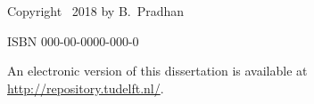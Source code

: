 \begin{titlepage}
\vspace{4\bigskipamount}

\noindent Copyright \textcopyright\ 2018 by B.~Pradhan


\medskip
\noindent ISBN 000-00-0000-000-0

\medskip
\noindent An electronic version of this dissertation is available at \\
\url{http://repository.tudelft.nl/}.

\end{titlepage}


